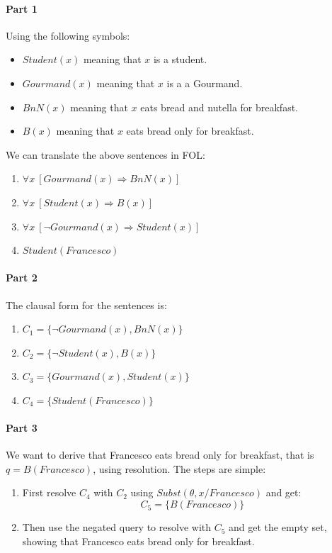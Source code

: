 \documentclass[10pt,a4paper]{article}
\newcommand{\braces}[1]{%
  \lbrace{#1}\rbrace}
\newcommand{\subst}[1]{Subst(\theta,#1)}
\begin{document}
\paragraph{Part 1}

Using the following symbols:
\begin{itemize}
\item $Student(x)$ meaning that $x$ is a student.
\item $Gourmand(x)$ meaning that $x$ is a a Gourmand.
\item $BnN(x)$ meaning that $x$ eats bread and nutella for breakfast.
\item $B(x)$ meaning that $x$ eats bread only for breakfast.
\end{itemize}

We can translate the above sentences in FOL:
\begin{enumerate}
\item $\forall x\ [Gourmand(x) \Rightarrow BnN(x)]$
\item $\forall x\ [Student(x) \Rightarrow B(x)]$
\item $\forall x\ [\neg Gourmand(x) \Rightarrow Student(x)]$
\item $Student(Francesco)$
\end{enumerate}

\paragraph{Part 2}
The clausal form for the sentences is:

\begin{enumerate}
\item $C_1=\braces{\neg Gourmand(x), BnN(x)}$
\item $C_2=\braces{\neg Student(x), B(x)}$
\item $C_3=\braces{Gourmand(x), Student(x)}$
\item $C_4=\braces{Student(Francesco)}$
\end{enumerate}

\paragraph{Part 3}

We want to derive that Francesco eats bread only for breakfast, that is $q=B(Francesco)$, using resolution. The steps are simple:

\begin{enumerate}
\item First resolve $C_4$ with $C_2$ using $\subst{x/Francesco}$ and get:
\[C_5=\braces{B(Francesco)}\]
\item Then use the negated query to resolve with $C_5$ and get the empty set, showing that Francesco eats bread only for breakfast.
\end{enumerate}
\end{document}
